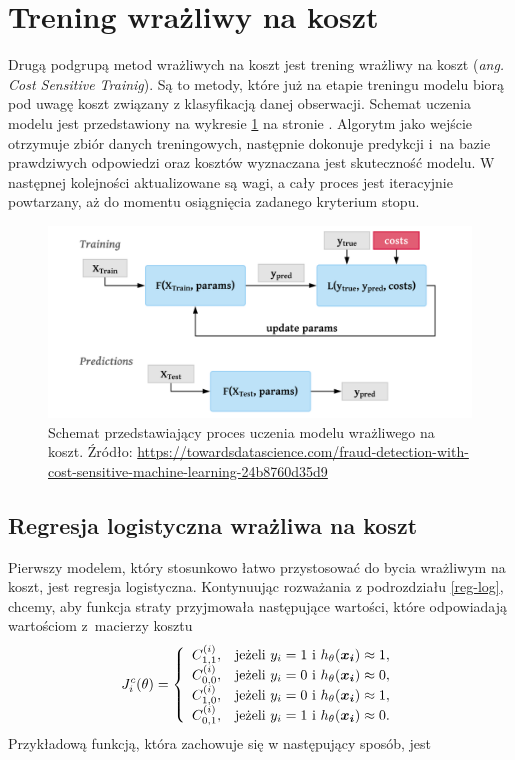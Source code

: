 \documentclass[inzynierska]{pwr_wmat_praca_dyplomowa}
\theoremstyle{plain}
\numberwithin{theorem}{chapter}
\theoremstyle{definition}
\numberwithin{theorem}{chapter}
\begin{document}
\section{Trening wrażliwy na koszt}
Drugą podgrupą metod wrażliwych na koszt jest trening wrażliwy na koszt (\textit{ang. Cost Sensitive Trainig}). Są to metody, które już na etapie treningu modelu biorą pod uwagę koszt związany z klasyfikacją danej obserwacji. Schemat uczenia modelu jest przedstawiony na wykresie \ref{cst} na stronie \pageref{cst}. Algorytm jako wejście otrzymuje zbiór danych treningowych, następnie dokonuje predykcji i~na bazie prawdziwych odpowiedzi oraz kosztów wyznaczana jest skuteczność modelu. W następnej kolejności aktualizowane są wagi, a cały proces jest iteracyjnie powtarzany, aż do momentu osiągnięcia zadanego kryterium stopu.
\begin{figure}[h]
	\includegraphics[width=\linewidth]{images/cost_sensitive_training.png}
	\caption{Schemat przedstawiający proces uczenia modelu wrażliwego na koszt. Źródło: \url{https://towardsdatascience.com/fraud-detection-with-cost-sensitive-machine-learning-24b8760d35d9}}
	\label{cst}
\end{figure}	

\subsection{Regresja logistyczna wrażliwa na koszt}
\label{cslr}
Pierwszy modelem, który stosunkowo łatwo przystosować do bycia wrażliwym na koszt, jest regresja logistyczna. Kontynuując rozważania z podrozdziału \ref{reg-log}, chcemy, aby funkcja straty przyjmowała następujące wartości, które odpowiadają wartościom z~macierzy kosztu
$$
J^c_i(\theta)=\left\{
\begin{array}{rl}
C^{(i)}_{1,1}, &\mbox{jeżeli $y_i = 1$ i $h_{\theta}(\boldsymbol{x_i}) \approx 1$}, \\
C^{(i)}_{0,0}, &\mbox{jeżeli $y_i = 0$ i $h_{\theta}(\boldsymbol{x_i}) \approx 0$}, \\
C^{(i)}_{1,0}, &\mbox{jeżeli $y_i = 0$ i $h_{\theta}(\boldsymbol{x_i}) \approx 1$}, \\
C^{(i)}_{0,1}, &\mbox{jeżeli $y_i = 1$ i $h_{\theta}(\boldsymbol{x_i}) \approx 0$}.
\end{array}
\right.
$$
Przykładową funkcją, która zachowuje się w następujący sposób, jest
\end{document}
